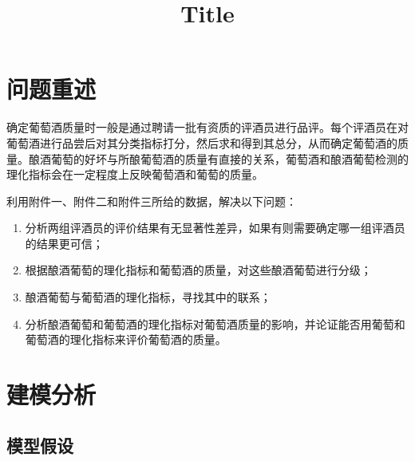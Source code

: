 \documentclass[nocover]{cumcmart}%
\begin{document}


\title{Title}

\maketitle

\begin{cnabstract}%


\end{cnabstract}

\newpage


\section{问题重述}
确定葡萄酒质量时一般是通过聘请一批有资质的评酒员进行品评。每个评酒员在对葡萄酒进行品尝后对其分类指标打分，然后求和得到其总分，从而确定葡萄酒的质量。酿酒葡萄的好坏与所酿葡萄酒的质量有直接的关系，葡萄酒和酿酒葡萄检测的理化指标会在一定程度上反映葡萄酒和葡萄的质量。

利用附件一、附件二和附件三所给的数据，解决以下问题：
    \begin{enumerate}
        \item 分析两组评酒员的评价结果有无显著性差异，如果有则需要确定哪一组评酒员的结果更可信；
        \item 根据酿酒葡萄的理化指标和葡萄酒的质量，对这些酿酒葡萄进行分级；
        \item 酿酒葡萄与葡萄酒的理化指标，寻找其中的联系；
        \item 分析酿酒葡萄和葡萄酒的理化指标对葡萄酒质量的影响，并论证能否用葡萄和葡萄酒的理化指标来评价葡萄酒的质量。
    \end{enumerate}

\section{建模分析}

    \subsection{模型假设}
\end{document}
